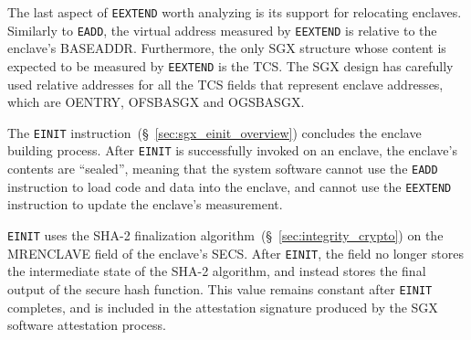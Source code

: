 
The last aspect of \texttt{EEXTEND} worth analyzing is its support for
relocating enclaves. Similarly to \texttt{EADD}, the virtual address measured
by \texttt{EEXTEND} is relative to the enclave's BASEADDR. Furthermore, the
only SGX structure whose content is expected to be measured by \texttt{EEXTEND}
is the TCS. The SGX design has carefully used relative addresses for all the
TCS fields that represent enclave addresses, which are OENTRY, OFSBASGX and
OGSBASGX.




The \texttt{EINIT} instruction~(\S~\ref{sec:sgx_einit_overview}) concludes the
enclave building process. After \texttt{EINIT} is successfully invoked on an
enclave, the enclave's contents are ``sealed'', meaning that the system software
cannot use the \texttt{EADD} instruction to load code and data into the
enclave, and cannot use the \texttt{EEXTEND} instruction to update the
enclave's measurement.

\texttt{EINIT} uses the SHA-2 finalization
algorithm~(\S~\ref{sec:integrity_crypto}) on the MRENCLAVE field of the
enclave's SECS. After \texttt{EINIT}, the field no longer stores the
intermediate state of the SHA-2 algorithm, and instead stores the final output
of the secure hash function. This value remains constant after \texttt{EINIT}
completes, and is included in the attestation signature produced by the
SGX software attestation process.
